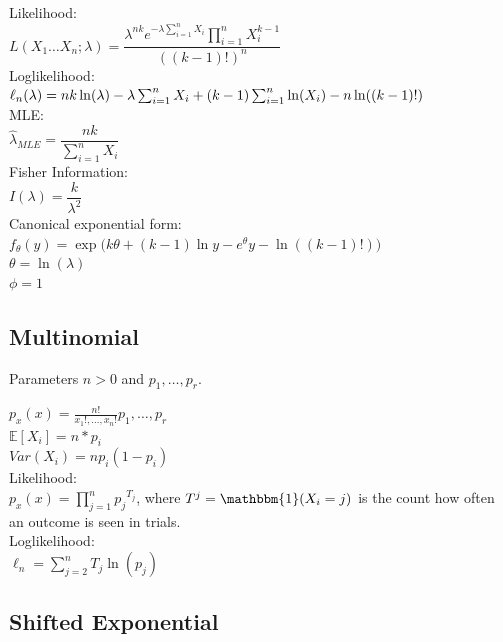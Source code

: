 Likelihood:\\
$L(X_1\dots X_n;\lambda)=
\dfrac{\lambda^{nk}e^{-\lambda\sum_{i=1}^n X_i}\prod_{i=1}^n X_i^{k-1}}
{((k-1)!)^n}$\\

Loglikelihood:\\
$\ell_n (\lambda)=nk\ln(\lambda)-\lambda\sum_{i=1}^n X_i\\
+(k-1)\sum_{i=1}^n\ln(X_i)-n\ln((k-1)!)$\\

MLE:\\
$\hat{\lambda}_{MLE}= \dfrac{nk}{\sum^{n}_{i=1}X_i}$\\

Fisher Information:\\
$I(\lambda)= \dfrac{k}{\lambda^2}$\\

Canonical exponential form:\\
$f_{\theta}(y) = 
\exp\Big(k\theta + (k-1)\ln y - e^{\theta}y - \ln((k-1)!)\Big)$\\
$\theta = \ln(\lambda)$\\
$\phi = 1$\\

\subsection*{Multinomial}

Parameters $n>0$ and $p_1, \ldots, p_r$.

$p_x(x)= \frac{n!}{x_1!,\ldots,x_n!} p_1, \ldots, p_r$\\


$\mathbb{E}[X_i]=n*p_i$\\

$Var(X_i)=np_i(1-p_i)$\\


Likelihood:\\

$p_x(x)= \prod _{j=1}^{n}{p_{{j}}}^{T_{{j}}}$, where $T^j=\mathbbm{1}( X_i=j)$ is the count how often an outcome is seen in trials. \\

Loglikelihood:\\
$\ell_n= \sum _{j=2}^{n}T_{{j}}\ln  \left( p_{{j}} \right)$\\


\subsection*{Shifted Exponential}

